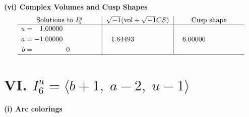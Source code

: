 \documentclass[1p]{elsarticle_modified}
\theoremstyle{definition}
\newcommand{\I}{\sqrt{-1}}
\begin{document}
\newpage\flushleft \textbf{(vi) Complex Volumes and Cusp Shapes}
$$\begin{array}{c|c|c}  
\text{Solutions to }I^u_{5}& \I (\text{vol} + \sqrt{-1}CS) & \text{Cusp shape}\\
 \hline 
\begin{aligned}
u &= \phantom{-}1.00000\phantom{ +0.000000I} \\
a &= -1.00000\phantom{ +0.000000I} \\
b &= \phantom{-0.000000 } 0\end{aligned}
 & \phantom{-}1.64493\phantom{ +0.000000I} & \phantom{-}6.00000\phantom{ +0.000000I}\\
 \hline 
 \end{array}$$\newpage\newpage\renewcommand{\arraystretch}{1}
\centering \section*{VI. $I^u_{6}= \langle b+1,\;a-2,\;u-1 \rangle$}
\flushleft \textbf{(i) Arc colorings}\\
\end{document}
